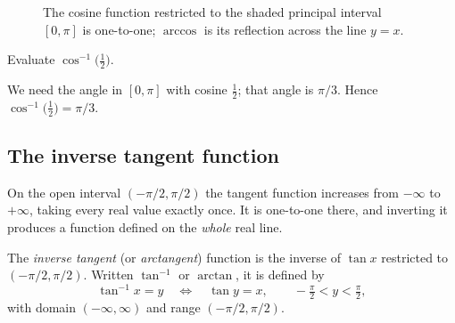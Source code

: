 \begin{figure}[H]
\centering
{}
\caption{The cosine function restricted to the shaded principal interval \([0, \pi]\) is one-to-one; \(\arccos\) is its reflection across the line \(y = x\).}
\label{fig:inverse-cosine}
\end{figure}

\begin{workedexample}
\begin{example}\label{ex:arccos-half}
Evaluate \(\cos^{-1}\!\bigl(\tfrac{1}{2}\bigr)\).
\end{example}

\begin{solution}
We need the angle in \([0, \pi]\) with cosine \(\tfrac{1}{2}\); that angle is \(\pi/3\). Hence \(\cos^{-1}\!\bigl(\tfrac{1}{2}\bigr) = \pi/3\).
\end{solution}
\end{workedexample}

\subsection{The inverse tangent function}

On the open interval \((-\pi/2, \pi/2)\) the tangent function increases from \(-\infty\) to \(+\infty\), taking every real value exactly once. It is one-to-one there, and inverting it produces a function defined on the \emph{whole} real line.

\begin{definition}\label{def:arctan}
The \emph{inverse tangent} (or \emph{arctangent}) function is the inverse of \(\tan x\) restricted to \((-\pi/2, \pi/2)\). Written \(\tan^{-1}\) or \(\arctan\), it is defined by
\[
\tan^{-1} x = y \quad\Longleftrightarrow\quad \tan y = x, \qquad -\tfrac{\pi}{2} < y < \tfrac{\pi}{2},
\]
with domain \((-\infty, \infty)\) and range \((-\pi/2, \pi/2)\).
\end{definition}

